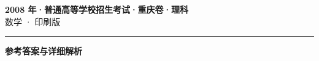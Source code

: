 \documentclass[zihao=5, a4paper]{ctexart}
\begin{document}
\begin{center}
  {\Large\bfseries 2008 年·普通高等学校招生考试·重庆卷·理科}\\[4pt]
  {\large 数学 · 印刷版}
\end{center}
\medskip
{}

\par\bigskip\hrule\bigskip
{}
\begin{center}{\large\bfseries 参考答案与详细解析}\end{center}
\smallskip

\end{document}
